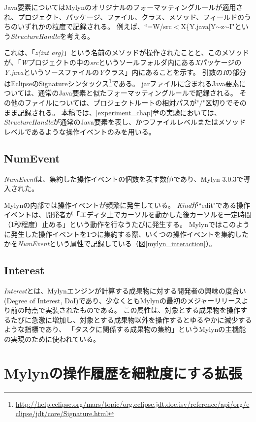 \documentclass[a4paper]{jsbook}
\begin{document}
Java要素についてはMylynのオリジナルのフォーマッティングルールが適用され、プロジェクト、パッケージ、ファイル、クラス、メソッド、フィールドのうちのいずれかの粒度で記録される。
例えば、``=W/src$<$X\{Y.java[Y$\sim$z$\sim$I"という{\it StructureHandle}を考える。

これは、「{\it z(int arg)}」という名前のメソッドが操作されたことと、このメソッドが、「{\it W}プロジェクトの中の{\it src}というソールフォルダ内にある{\it X}パッケージの{\it Y.java}というソースファイルの{\it Y}クラス」内にあることを示す。
引数の{\it I}の部分はEclipseのSignatureシンタックス\footnote{\url{http://help.eclipse.org/mars/topic/org.eclipse.jdt.doc.isv/reference/api/org/eclipse/jdt/core/Signature.html}}である。
jarファイルに含まれるJava要素については、通常のJava要素と似たフォーマッティングルールで記録される。
その他のファイルについては、プロジェクトルートの相対パスが"/"区切りでそのまま記録される。
本稿では、\ref{experiment_chap}章の実験においては、{\it StructureHandle}が通常のJava要素を表し、かつファイルレベルまたはメソッドレベルであるような操作イベントのみを用いる。
\section{NumEvent}
{\it NumEvent}は、集約した操作イベントの個数を表す数値であり、Mylyn 3.0.3で導入された。

Mylynの内部では操作イベントが頻繁に発生している。
{\it Kind}が``edit"である操作イベントは、開発者が「エディタ上でカーソルを動かした後カーソルを一定時間（1秒程度）止める」という動作を行なうたびに発生する。
Mylynではこのように発生した操作イベントを1つに集約する際、いくつの操作イベントを集約したかを{\it NumEvent}という属性で記録している（図\ref{mylyn_interaction}）。
\section{Interest}
{\it Interest}とは、Mylynエンジンが計算する成果物に対する開発者の興味の度合い(Degree of Interest, DoI)であり\cite{Kersten:2006}、少なくともMylynの最初のメジャーリリースより前の時点で実装されたものである。
この属性は、対象とする成果物を操作するたびに急激に増加し、対象とする成果物以外を操作するとゆるやかに減少するような指標であり、
「タスクに関係する成果物の集約」というMylynの主機能の実現のために使われている。

\chapter{Mylynの操作履歴を細粒度にする拡張}
\end{document}
